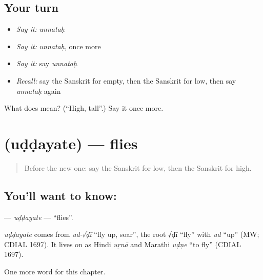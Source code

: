 \subsection*{Your turn}
\begin{itemize}
\raggedright
  \item \emph{Say it:} \emph{unnataḥ}
  \item \emph{Say it:} \emph{unnataḥ}, once more
  \item \emph{Say it:} say \emph{unnataḥ}
  \item \emph{Recall:} say the Sanskrit for empty, then the Sanskrit for low, then say \emph{unnataḥ} again
\end{itemize}

\begin{tcolorbox}[breakable,colback=teal!4,colframe=teal!35!black,title={Before you move on}]
What does  mean? (\textquotedblleft{}High, tall\textquotedblright{}.) Say it once more.
\end{tcolorbox}
\section[\texorpdfstring{\sk{उड्डयते} (uḍḍayate)}{उड्डयते (uḍḍayate)}]{ (uḍḍayate) — flies}

\label{lesson:SA-C133-uddayate}



\begin{quote}
Before the new one: say the Sanskrit for low, then the Sanskrit for high.
\end{quote}

\subsection*{You'll want to know: }
\textbf{} — \emph{uḍḍayate} — \textquotedblleft{}flies\textquotedblright{}.

\begin{cousinweb}
\emph{uḍḍayate} comes from \emph{ud-√ḍī} \textquotedblleft{}fly up, soar\textquotedblright{}, the root √ḍī \textquotedblleft{}fly\textquotedblright{} with \emph{ud} \textquotedblleft{}up\textquotedblright{} (MW; CDIAL 1697). It lives on as Hindi \emph{uṛnā} and Marathi \emph{uḍṇe} \textquotedblleft{}to fly\textquotedblright{} (CDIAL 1697).
\end{cousinweb}

\begin{grammarlens}[title={What you've built}]
One more word for this chapter.
\end{grammarlens}

